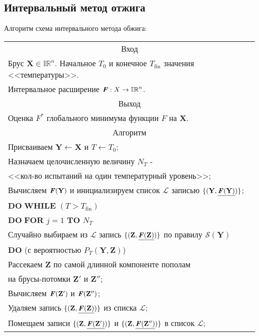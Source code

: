 \subsection{Интервальный метод отжига}
Алгоритм схема интервального метода обжига:
\begin{table}[H]
\centering
\begin{tabular}{|l| }
 \hline
\multicolumn{1}{|c|}{Вход}\\
     Брус $\mathbf{X}\in\mathbb{IR}^n$. Начальное $T_0$ и конечное $T_{\mathrm{fin}}$ значения <<температуры>>.\\
     Интервальное расширение $\textbf{\textit{F}}:X\rightarrow\mathbb{IR}^n$.\\
 \hline
 \multicolumn{1}{|c|}{Выход}\\
 Оценка $F^*$ глобального минимума функции $F$ на $\mathbf{X}$.\\
 \hline
 \multicolumn{1}{|c|}{Алгоритм}\\
 Присваиваем $\mathbf{Y} \leftarrow \mathbf{X}$ и $T\leftarrow T_0$;\\
 Назначаем целочисленную величину $N_T$ - \\<<кол-во испытаний на один температурный уровень>>;\\
 Вычисляем $\textbf{\textit{F}}(\mathbf{Y})$ и инициализируем список $\mathcal{L}$ записью $\{(\mathbf{Y},\underline{\textbf{\textit{F}}(\mathbf{Y})})\}$;\\
$\mathbf{DO\;WHILE}$ $(T>T_{\mathrm{fin}})$\\
\qquad $\mathbf{DO\;FOR}$ $j=1$ $\mathbf{TO}$ $N_T$\\
\qquad \qquad Случайно выбираем из $\mathcal{L}$ запись $\{(\mathbf{Z},\underline{\textbf{\textit{F}}(\mathbf{Z})})\}$ по правилу $\mathcal{S}(\mathbf{Y})$\\
\qquad\qquad $\mathbf{DO}$ (с вероятностью $P_T(\mathbf{Y}, \mathbf{Z})$)\\
\qquad\qquad\qquad Рассекаем $\mathbf{Z}$ по самой длинной компоненте пополам\\
\qquad\qquad\qquad на брусы-потомки $\mathbf{Z}'$ и $\mathbf{Z}''$;\\
\qquad\qquad\qquad Вычисляем $\textbf{\textit{F}}(\mathbf{Z'})$ и $\textbf{\textit{F}}(\mathbf{Z''})$;\\
\qquad\qquad\qquad Удаляем запись $\{(\mathbf{Z},\underline{\textbf{\textit{F}}(\mathbf{Z})})\}$ из списка $\mathcal{L}$;\\
\qquad\qquad\qquad Помещаем записи $\{(\mathbf{Z},\underline{\textbf{\textit{F}}(\mathbf{Z'})})\}$ и $\{(\mathbf{Z},\underline{\textbf{\textit{F}}(\mathbf{Z''})})\}$ в список $\mathcal{L}$;\\

\end{tabular}
\end{table}
